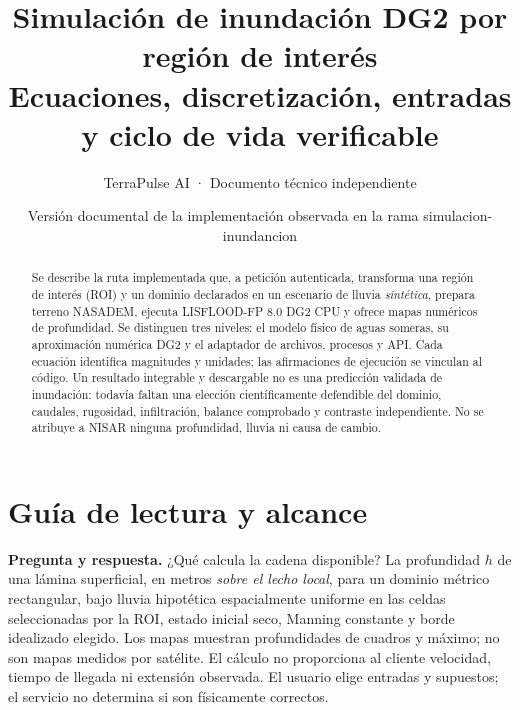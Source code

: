 \documentclass[11pt,a4paper]{article}
\title{Simulación de inundación DG2 por región de interés\\\large Ecuaciones, discretización, entradas y ciclo de vida verificable}
\author{TerraPulse AI · Documento técnico independiente}
\date{Versión documental de la implementación observada en la rama simulacion-inundancion}
\begin{document}
\maketitle
\begin{abstract}
Se describe la ruta implementada que, a petición autenticada, transforma una región de interés (ROI) y un dominio declarados en un escenario de lluvia \emph{sintética}, prepara terreno NASADEM, ejecuta LISFLOOD-FP 8.0 DG2 CPU y ofrece mapas numéricos de profundidad. Se distinguen tres niveles: el modelo físico de aguas someras, su aproximación numérica DG2 y el adaptador de archivos, procesos y API. Cada ecuación identifica magnitudes y unidades; las afirmaciones de ejecución se vinculan al código. Un resultado integrable y descargable no es una predicción validada de inundación: todavía faltan una elección científicamente defendible del dominio, caudales, rugosidad, infiltración, balance comprobado y contraste independiente. No se atribuye a NISAR ninguna profundidad, lluvia ni causa de cambio.
\end{abstract}
\tableofcontents\newpage

\section{Guía de lectura y alcance}
\label{sec:alcance}
\begin{center}
\end{center}
\noindent\textbf{Pregunta y respuesta.} ¿Qué calcula la cadena disponible? La profundidad $h$ de una lámina superficial, en metros \emph{sobre el lecho local}, para un dominio métrico rectangular, bajo lluvia hipotética espacialmente uniforme en las celdas seleccionadas por la ROI, estado inicial seco, Manning constante y borde idealizado elegido. Los mapas muestran profundidades de cuadros y máximo; no son mapas medidos por satélite. El cálculo no proporciona al cliente velocidad, tiempo de llegada ni extensión observada. El usuario elige entradas y supuestos; el servicio no determina si son físicamente correctos.
\end{document}
